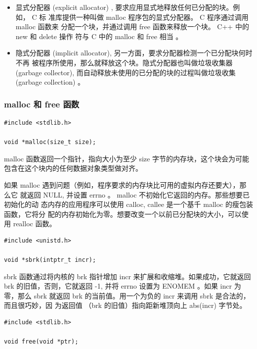 \begin{itemize}
    \item 显式分配器 (explicit allocator) , 要求应用显式地释放任何已分配的块。例如， C 标
          准库提供一种叫做 malloc 程序包的显式分配器。 C 程序通过调用 malloc 函数来
          分配一个块，并通过调用 free 函数来释放一个块。 C++ 中的 new 和 delete 操作
          符与 C 中的 malloc 和 free 相当 。
    \item 隐式分配器 (implicit allocator), 另一方面，要求分配器检测一个已分配块何时不再
          被程序所使用，那么就释放这个块。隐式分配器也叫做垃圾收集器 (garbage collector),
          而自动释放未使用的已分配的块的过程叫做垃圾收集 (garbage collection) 。
\end{itemize}

\subsubsection{malloc 和 free 函数}

\begin{lstlisting}[style=CStyle]
#include <stdlib.h>

void *malloc(size_t size);
\end{lstlisting}

malloc 函数返回一个指针，指向大小为至少 size 字节的内存块，这个块会为可能包含在这个块内的任何数据对象类型做对齐。

如果 malloc 遇到问题（例如，程序要求的内存块比可用的虚拟内存还要大），那么它
就返回 NULL, 并设置 errno 。 malloc 不初始化它返回的内存。那些想要已初始化的动
态内存的应用程序可以使用 calloc, callee 是一个基千 malloc 的瘦包装函数，它将分
配的内存初始化为零。想要改变一个以前已分配块的大小，可以使用 realloc 函数。

\begin{lstlisting}[style=CStyle]
#include <unistd.h>

void *sbrk(intptr_t incr);
\end{lstlisting}

sbrk 函数通过将内核的 brk 指针增加 incr 来扩展和收缩堆。如果成功，它就返回
brk 的旧值，否则，它就返回 -1, 并将 errno 设置为 ENOMEM 。如果 incr 为零，那么
sbrk 就返回 brk 的当前值。用一个为负的 incr 来调用 sbrk 是合法的，而且很巧妙，因
为返回值 （brk 的旧值）指向距新堆顶向上 abs(incr) 字节处。

\begin{lstlisting}[style=CStyle]
#include <stdlib.h>

void free(void *ptr);
\end{lstlisting}


